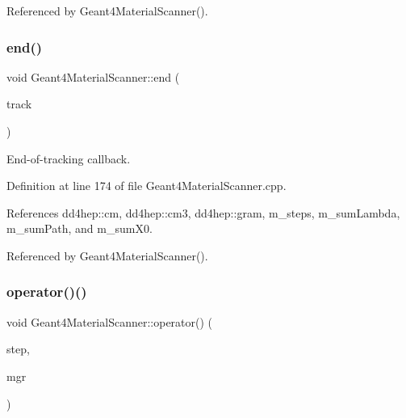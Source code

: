 Referenced by Geant4\+Material\+Scanner().

\hypertarget{class_d_d4hep_1_1_simulation_1_1_geant4_material_scanner_a08dd7d2ac6bece93af5709c1c2edc64c}{}\label{class_d_d4hep_1_1_simulation_1_1_geant4_material_scanner_a08dd7d2ac6bece93af5709c1c2edc64c} 
\subsubsection{\texorpdfstring{end()}{end()}}
{\footnotesize\ttfamily void Geant4\+Material\+Scanner\+::end (\begin{DoxyParamCaption}\item[{const G4\+Track $\ast$}]{track }\end{DoxyParamCaption})\hspace{0.3cm}{\ttfamily [virtual]}}



End-\/of-\/tracking callback. 



Definition at line 174 of file Geant4\+Material\+Scanner.\+cpp.



References dd4hep\+::cm, dd4hep\+::cm3, dd4hep\+::gram, m\+\_\+steps, m\+\_\+sum\+Lambda, m\+\_\+sum\+Path, and m\+\_\+sum\+X0.



Referenced by Geant4\+Material\+Scanner().

\hypertarget{class_d_d4hep_1_1_simulation_1_1_geant4_material_scanner_abd897a6b73a1855f674962d0e6126c17}{}\label{class_d_d4hep_1_1_simulation_1_1_geant4_material_scanner_abd897a6b73a1855f674962d0e6126c17} 
\subsubsection{\texorpdfstring{operator()()}{operator()()}}
{\footnotesize\ttfamily void Geant4\+Material\+Scanner\+::operator() (\begin{DoxyParamCaption}\item[{const G4\+Step $\ast$}]{step,  }\item[{G4\+Stepping\+Manager $\ast$}]{mgr }\end{DoxyParamCaption})\hspace{0.3cm}{\ttfamily [virtual]}}



